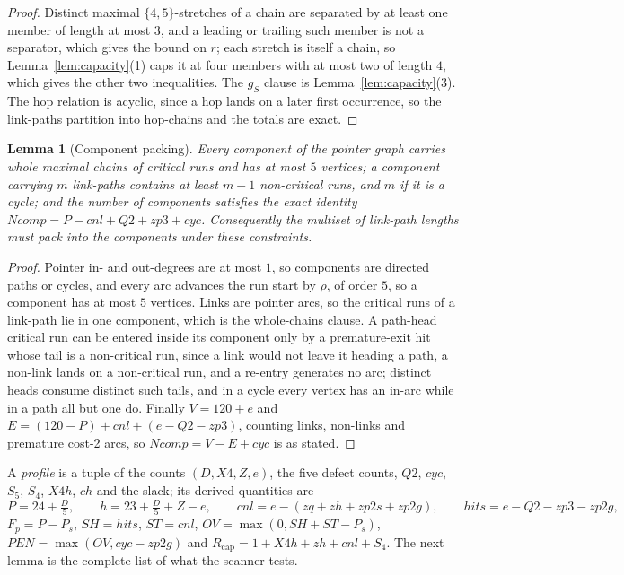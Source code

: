 \documentclass[10pt]{article}
\newtheorem{lemma}[theorem]{Lemma}
\theoremstyle{remark}
\theoremstyle{plain}
\newcommand{\NCh}{\mathit{ch}}
\newcommand{\Ncyc}{\mathit{cyc}}
\begin{document}
\begin{proof}
Distinct maximal $\{4,5\}$-stretches of a chain are separated by at
least one member of length at most $3$, and a leading or trailing such
member is not a separator, which gives the bound on $r$; each stretch
is itself a chain, so Lemma~\ref{lem:capacity}(1) caps it at four
members with at most two of length $4$, which gives the other two
inequalities.  The $g_S$ clause is Lemma~\ref{lem:capacity}(3).  The
hop relation is acyclic, since a hop lands on a later first occurrence,
so the link-paths partition into hop-chains and the totals are exact.
\end{proof}

\begin{lemma}[Component packing]\label{lem:packing}
Every component of the pointer graph carries whole maximal chains of
critical runs and has at most $5$ vertices; a component carrying $m$
link-paths contains at least $m-1$ non-critical runs, and $m$ if it is
a cycle; and the number of components satisfies the exact identity
$\mathit{Ncomp}=P-\mathit{cnl}+Q2+zp3+\Ncyc$.  Consequently the
multiset of link-path lengths must pack into the components under these
constraints.
\end{lemma}

\begin{proof}
Pointer in- and out-degrees are at most $1$, so components are directed
paths or cycles, and every arc advances the run start by $\rho$, of
order $5$, so a component has at most $5$ vertices.  Links are pointer arcs, so the critical runs of a
link-path lie in one component, which is the whole-chains clause.  A
path-head critical run can be entered inside its component only by a
premature-exit hit whose tail is a non-critical run, since a link would
not leave it heading a path, a non-link lands on a non-critical run,
and a re-entry generates no arc; distinct heads consume distinct such
tails, and in a cycle every vertex has an in-arc while in a path all
but one do.  Finally $V=120+e$ and
$E=(120-P)+\mathit{cnl}+(e-Q2-zp3)$, counting links, non-links and
premature cost-2 arcs, so $\mathit{Ncomp}=V-E+\Ncyc$ is as stated.
\end{proof}

A \emph{profile} is a tuple of the counts $(D,X4,Z,e)$, the five defect
counts, $Q2$, $\Ncyc$, $S_5$, $S_4$, $X4h$, $\NCh$ and the slack; its
derived quantities are
\[
P=24+\tfrac{D}{5},\qquad h=23+\tfrac{D}{5}+Z-e,\qquad
\mathit{cnl}=e-(zq+zh+zp2s+zp2g),\qquad
\mathit{hits}=e-Q2-zp3-zp2g,
\]
$F_p=P-P_s$, $\mathit{SH}=\mathit{hits}$, $\mathit{ST}=\mathit{cnl}$,
$\mathit{OV}=\max(0,\mathit{SH}+\mathit{ST}-P_s)$,
$\mathit{PEN}=\max(\mathit{OV},\Ncyc-zp2g)$ and
$R_{\mathrm{cap}}=1+X4h+zh+\mathit{cnl}+S_4$.  The next lemma is the
complete list of what the scanner tests.
\end{document}
